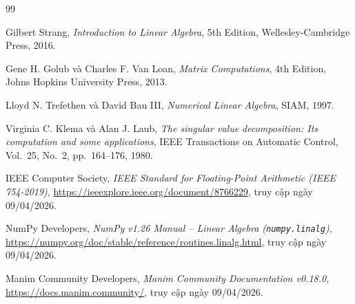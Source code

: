 \newpage
\begin{thebibliography}{99}


    Gilbert Strang, \textit{Introduction to Linear Algebra}, 5th Edition,
    Wellesley-Cambridge Press, 2016.

    Gene H. Golub và Charles F. Van Loan, \textit{Matrix Computations},
    4th Edition, Johns Hopkins University Press, 2013.

    Lloyd N. Trefethen và David Bau III, \textit{Numerical Linear Algebra},
    SIAM, 1997.

    Virginia C. Klema và Alan J. Laub,
    \textit{The singular value decomposition: Its computation and some applications},
    IEEE Transactions on Automatic Control, Vol.~25, No.~2, pp.~164--176, 1980.


    IEEE Computer Society,
    \textit{IEEE Standard for Floating-Point Arithmetic (IEEE 754-2019)},
    \url{https://ieeexplore.ieee.org/document/8766229},
    truy cập ngày 09/04/2026.


    NumPy Developers,
    \textit{NumPy v1.26 Manual -- Linear Algebra (\texttt{numpy.linalg})},
    \url{https://numpy.org/doc/stable/reference/routines.linalg.html},
    truy cập ngày 09/04/2026.

    Manim Community Developers,
    \textit{Manim Community Documentation v0.18.0},
    \url{https://docs.manim.community/},
    truy cập ngày 09/04/2026.

\end{thebibliography}
